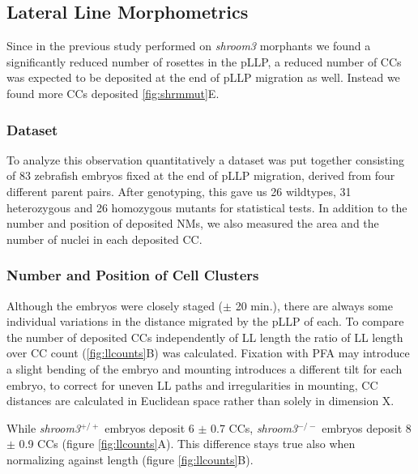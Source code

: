 \documentclass[11pt,singlespacinge,twoside]{reedthesis} %
\theoremstyle{definition}
\theoremstyle{definition}
\theoremstyle{definition}
\theoremstyle{remark}
\begin{document}
\hypertarget{lateral-line-morphometrics}{%
\subsection{Lateral Line Morphometrics}\label{lateral-line-morphometrics}}

Since in the previous study performed on \emph{shroom3} morphants we found a significantly reduced number of rosettes in the pLLP, a reduced number of CCs was expected to be deposited at the end of pLLP migration as well. Instead we found more CCs deposited \ref{fig:shrmmut}E.

\hypertarget{dataset}{%
\subsubsection{Dataset}\label{dataset}}

To analyze this observation quantitatively a dataset was put together consisting of 83 zebrafish embryos fixed at the end of pLLP migration, derived from four different parent pairs. After genotyping, this gave us 26 wildtypes, 31 heterozygous and 26 homozygous mutants for statistical tests. In addition to the number and position of deposited NMs, we also measured the area and the number of nuclei in each deposited CC.

\hypertarget{res-ccounts}{%
\subsubsection{Number and Position of Cell Clusters}\label{res-ccounts}}

Although the embryos were closely staged (\(\pm\) 20 min.), there are always some individual variations in the distance migrated by the pLLP of each. To compare the number of deposited CCs independently of LL length the ratio of LL length over CC count (\ref{fig:llcounts}B) was calculated. Fixation with PFA may introduce a slight bending of the embryo and mounting introduces a different tilt for each embryo, to correct for uneven LL paths and irregularities in mounting, CC distances are calculated in Euclidean space rather than solely in dimension X.

While \emph{shroom3}\(^{+/+}\) embryos deposit 6 \(\pm\) 0.7 CCs, \emph{shroom3}\(^{-/-}\) embryos deposit 8 \(\pm\) 0.9 CCs (figure \ref{fig:llcounts}A). This difference stays true also when normalizing against length (figure \ref{fig:llcounts}B).
\end{document}
